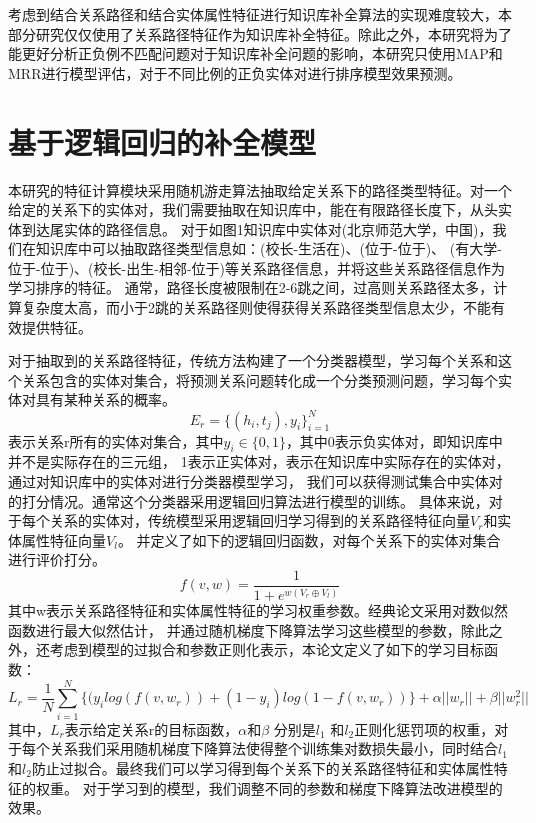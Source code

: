考虑到结合关系路径和结合实体属性特征进行知识库补全算法的实现难度较大，本部分研究仅仅使用了关系路径特征作为知识库补全特征。除此之外，本研究将为了能更好分析正负例不匹配问题对于知识库补全问题的影响，本研究只使用MAP和MRR进行模型评估，对于不同比例的正负实体对进行排序模型效果预测。

\section{基于逻辑回归的补全模型}

本研究的特征计算模块采用随机游走算法抽取给定关系下的路径类型特征。对一个给定的关系下的实体对，我们需要抽取在知识库中，能在有限路径长度下，从头实体到达尾实体的路径信息。
对于如图1知识库中实体对(北京师范大学，中国)，我们在知识库中可以抽取路径类型信息如：(校长-生活在)、(位于-位于)、
(有大学-位于-位于)、(校长-出生-相邻-位于)等关系路径信息，并将这些关系路径信息作为学习排序的特征。
通常，路径长度被限制在2-6跳之间，过高则关系路径太多，计算复杂度太高，而小于2跳的关系路径则使得获得关系路径类型信息太少，不能有效提供特征。

对于抽取到的关系路径特征，传统方法构建了一个分类器模型，学习每个关系和这个关系包含的实体对集合，将预测关系问题转化成一个分类预测问题，学习每个实体对具有某种关系的概率。
$$E_r=\{(h_i,t_j),y_i\}^N_{i=1} $$
表示关系r所有的实体对集合，其中$y_i\in \{0,1\}$，其中0表示负实体对，即知识库中并不是实际存在的三元组，
1表示正实体对，表示在知识库中实际存在的实体对，通过对知识库中的实体对进行分类器模型学习，
我们可以获得测试集合中实体对的打分情况。通常这个分类器采用逻辑回归算法进行模型的训练。
具体来说，对于每个关系的实体对，传统模型采用逻辑回归学习得到的关系路径特征向量$V_r$和实体属性特征向量$V_l$。
并定义了如下的逻辑回归函数，对每个关系下的实体对集合进行评价打分。
$$f(v,w)=\frac{1}{1+e^{w(V_r \oplus V_l)}}$$
其中w表示关系路径特征和实体属性特征的学习权重参数。经典论文采用对数似然函数进行最大似然估计，
并通过随机梯度下降算法学习这些模型的参数，除此之外，还考虑到模型的过拟合和参数正则化表示，本论文定义了如下的学习目标函数：
$$L_r=\frac{1}{N}\sum_{i=1}^N \{(y_ilog(f(v,w_r)) + (1-y_i)log(1-f(v,w_r))\}+\alpha ||w_r||+\beta||w_r^2||$$
其中，$L_r$表示给定关系r的目标函数，$\alpha$和$\beta$ 分别是$l_1$ 和$l_2$正则化惩罚项的权重，对于每个关系我们采用随机梯度下降算法使得整个训练集对数损失最小，同时结合$l_1$ 和$l_2$防止过拟合。最终我们可以学习得到每个关系下的关系路径特征和实体属性特征的权重。
对于学习到的模型，我们调整不同的参数和梯度下降算法改进模型的效果。


